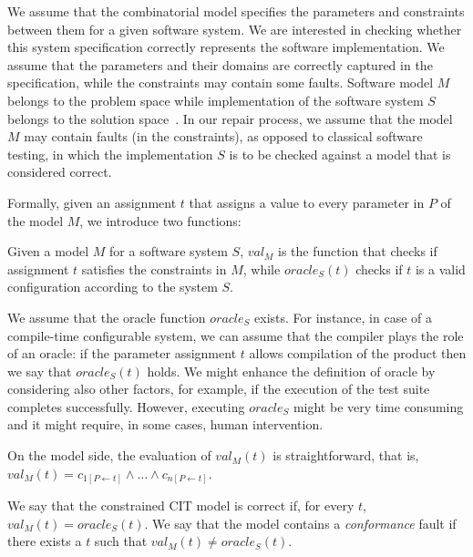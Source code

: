 \begin{tikzborder}{\cite{Gargantini16:validation}}
\begin{tikzborder}{\cite{gargantini_combinatorial_2017}}
\begin{tikzborder}{\cite{gargantini_combinatorial_2017}}
\bb
We assume that the combinatorial model specifies the parameters and constraints between them for a given software system. 
We are interested in checking whether this system specification 
correctly represents the software implementation. We assume that the parameters and their domains are correctly captured in the specification, while the constraints may contain some faults. 
Software model $M$ belongs to the problem space while implementation of the software system $S$ belongs to the solution space~\cite{NadiBKC14}.
In our repair process, we assume that the model $M$ may contain faults (in the constraints), as opposed to classical software testing, in which the implementation $S$ is to be checked against a model that is considered correct.



Formally, given an assignment $t$ that assigns a value to every parameter in $P$ of the model $M$,
we introduce two functions:
\begin{defn}%
	Given a model $M$ for a software system $S$, $val_{M}$ is the function
	that checks if assignment $t$ 
	satisfies the constraints in $M$, while
	$\mathit{oracle}_{S}(t
	)$ checks if $t$ 
	is a valid configuration according to the system $S$.
\end{defn}


We assume that the oracle function $\mathit{oracle}_{S}$ exists. For instance, in case of a compile-time configurable system, we can assume that the compiler plays the role of an oracle: if the parameter assignment $t$ allows compilation of the product then we say that $\mathit{oracle}_{S}(t)$ holds. We might enhance the definition of oracle by considering also other factors, for example, if the execution of the test suite completes successfully. However, executing  $\mathit{oracle}_{S}$ might be very time consuming and it might require, in some cases, human intervention.

On the model side, the evaluation of  $val_{M}(t
)$ is straightforward, that is, $val_{M}(
t)=c_{1[P\leftarrow
	t]}\wedge \ldots\wedge c_{n[P\leftarrow
	t]}$.


\begin{defn}
	\label{def:correctness}We say that the constrained CIT model is correct if, for
	every $t$, $val_{M}(t)=\mathit{oracle}_{S}(t)$. We say that the model
	contains a \emph{conformance} fault if there exists a $t$ 
	such that $val_{M}(
	t)\neq \mathit{oracle}_{S}(
	t)$.
\end{defn}
\be


\end{tikzborder}
\end{tikzborder}
\end{tikzborder}
